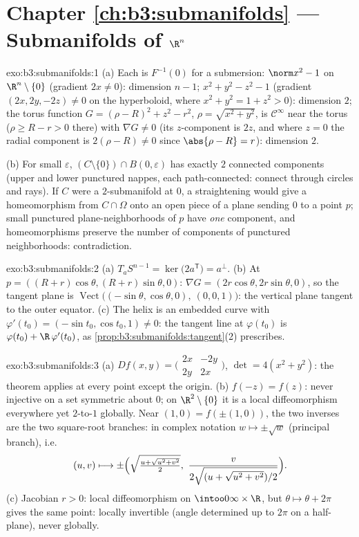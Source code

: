 \section*{Chapter \ref{ch:b3:submanifolds} --- Submanifolds of
$\R^n$}

\begin{solution}{exo:b3:submanifolds:1}
(a) Each is $F^{-1}(0)$ for a submersion: $\norm x^2 - 1$ on
$\R^n\setminus\{0\}$ (gradient $2x \neq 0$): dimension $n-1$;
$x^2 + y^2 - z^2 - 1$ (gradient $(2x, 2y, -2z) \neq 0$ on the
hyperboloid, where $x^2 + y^2 = 1 + z^2 > 0$): dimension $2$;
the torus function $G = (\rho - R)^2 + z^2 - r^2$, $\rho =
\sqrt{x^2+y^2}$, is $\mathcal C^\infty$ near the torus ($\rho
\geq R - r > 0$ there) with $\nabla G \neq 0$ (its
$z$-component is $2z$, and where $z = 0$ the radial component
is $2(\rho - R)\ne0$ since $\abs{\rho - R} = r$): dimension
$2$.

(b) For small $\varepsilon$,
$(C\setminus\{0\})\cap B(0,\varepsilon)$ has exactly $2$
connected components (upper and lower punctured nappes, each
path-connected: connect through circles and rays). If $C$
were a $2$-submanifold at $0$, a straightening would give a
homeomorphism from $C\cap\Omega$ onto an open piece of a
plane sending $0$ to a point $p$; small punctured
plane-neighborhoods of $p$ have \emph{one} component, and
homeomorphisms preserve the number of components of punctured
neighborhoods: contradiction.
\end{solution}

\begin{solution}{exo:b3:submanifolds:2}
(a) $T_aS^{n-1} = \ker\bigl(2a^{\mathsf T}\bigr) = a^\perp$.
(b) At $p = ((R+r)\cos\theta, (R+r)\sin\theta, 0)$: $\nabla G
= (2r\cos\theta, 2r\sin\theta, 0)$, so the tangent plane is
$\operatorname{Vect}\bigl((-\sin\theta, \cos\theta, 0),\ (0,
0, 1)\bigr)$: the vertical plane tangent to the outer
equator.
(c) The helix is an embedded curve with $\varphi'(t_0) =
(-\sin t_0, \cos t_0, 1) \neq 0$: the tangent line at
$\varphi(t_0)$ is $\varphi(t_0) + \R\,\varphi'(t_0)$, as
\cref{prop:b3:submanifolds:tangent}(2) prescribes.
\end{solution}

\begin{solution}{exo:b3:submanifolds:3}
(a) $Df(x,y) = \bigl(\begin{smallmatrix}2x & -2y\\ 2y &
2x\end{smallmatrix}\bigr)$, $\det = 4(x^2 + y^2)$: the
theorem applies at every point except the origin.
(b) $f(-z) = f(z)$: never injective on a set symmetric about
$0$; on $\R^2\setminus\{0\}$ it is a local diffeomorphism
everywhere yet $2$-to-$1$ globally. Near $(1, 0) = f(\pm(1,
0))$, the two inverses are the two square-root branches: in
complex notation $w \mapsto \pm\sqrt w$ (principal branch),
i.e.
\[
(u, v) \longmapsto \pm\Bigl(\sqrt{\tfrac{u +
\sqrt{u^2+v^2}}{2}},\ \frac{v}{2\sqrt{(u +
\sqrt{u^2+v^2})/2}}\Bigr).
\]
(c) Jacobian $r > 0$: local diffeomorphism on
$\intoo0\infty\times\R$, but $\theta \mapsto \theta + 2\pi$
gives the same point: locally invertible (angle determined up
to $2\pi$ on a half-plane), never globally.
\end{solution}

